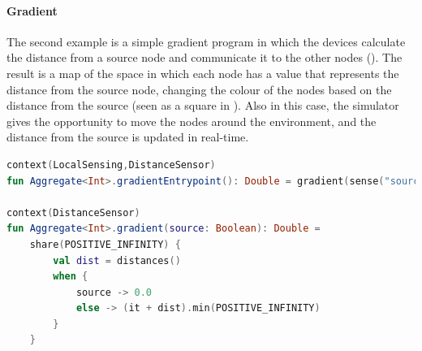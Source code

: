 \paragraph{Gradient}
The second example is a simple gradient program in which the devices calculate the distance from a source node and
communicate it to the other nodes ().
The result is a map of the space in which each node has a value that represents the distance from the source node,
changing the colour of the nodes based on the distance from the source (seen as a square in ).
Also in this case, the simulator gives the opportunity to move the nodes around the environment, and the distance from
the source is updated in real-time.

\begin{lstlisting}[language=kt, caption={Gradient code example}, label={lst:gradient-example}]
context(LocalSensing,DistanceSensor)
fun Aggregate<Int>.gradientEntrypoint(): Double = gradient(sense("source"))

context(DistanceSensor)
fun Aggregate<Int>.gradient(source: Boolean): Double =
    share(POSITIVE_INFINITY) {
        val dist = distances()
        when {
            source -> 0.0
            else -> (it + dist).min(POSITIVE_INFINITY)
        }
    }
\end{lstlisting}

